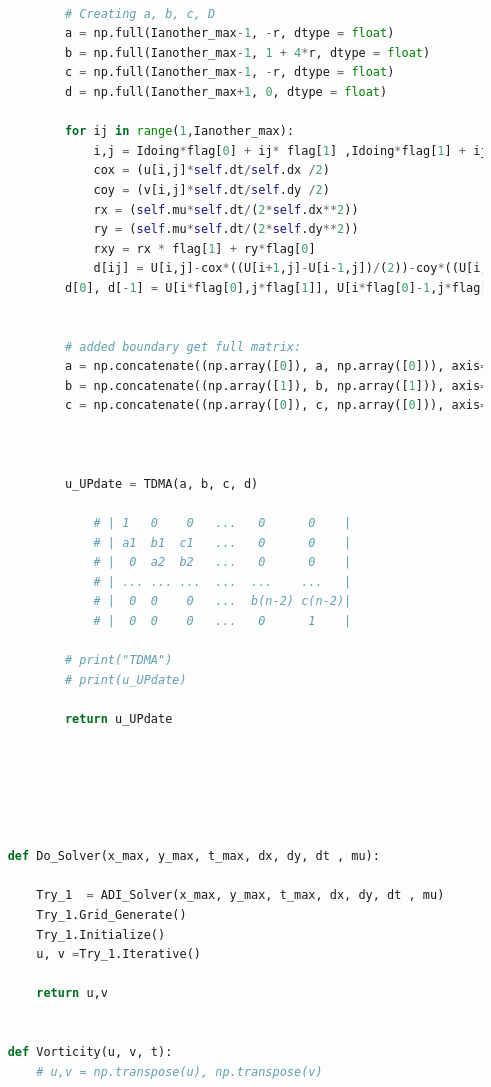 \documentclass[12pt]{article}
\begin{document}
\begin{scriptsize}
\begin{lstlisting}[language=python,caption={ADI Solver}]
    
            # Creating a, b, c, D
            a = np.full(Ianother_max-1, -r, dtype = float)
            b = np.full(Ianother_max-1, 1 + 4*r, dtype = float)
            c = np.full(Ianother_max-1, -r, dtype = float)
            d = np.full(Ianother_max+1, 0, dtype = float)
    
            for ij in range(1,Ianother_max):
                i,j = Idoing*flag[0] + ij* flag[1] ,Idoing*flag[1] + ij* flag[0]
                cox = (u[i,j]*self.dt/self.dx /2)
                coy = (v[i,j]*self.dt/self.dy /2)
                rx = (self.mu*self.dt/(2*self.dx**2))
                ry = (self.mu*self.dt/(2*self.dy**2))
                rxy = rx * flag[1] + ry*flag[0]
                d[ij] = U[i,j]-cox*((U[i+1,j]-U[i-1,j])/(2))-coy*((U[i,j+1]-U[i,j-1])/(2))+rxy*(U[i+flag[0],j+flag[1]]+U[i-flag[0],j-flag[1]])
            d[0], d[-1] = U[i*flag[0],j*flag[1]], U[i*flag[0]-1,j*flag[1]-1]
            
            
            # added boundary get full matrix:
            a = np.concatenate((np.array([0]), a, np.array([0])), axis=0)
            b = np.concatenate((np.array([1]), b, np.array([1])), axis=0)
            c = np.concatenate((np.array([0]), c, np.array([0])), axis=0)
    
    
               
            u_UPdate = TDMA(a, b, c, d)
    
                # | 1   0    0   ...   0      0    |
                # | a1  b1  c1   ...   0      0    |
                # |  0  a2  b2   ...   0      0    |
                # | ... ... ...  ...  ...    ...   |
                # |  0  0    0   ...  b(n-2) c(n-2)|
                # |  0  0    0   ...   0      1    |
            
            # print("TDMA")
            # print(u_UPdate)
    
            return u_UPdate
    
    
    
    
    
    
    def Do_Solver(x_max, y_max, t_max, dx, dy, dt , mu):
         
        Try_1  = ADI_Solver(x_max, y_max, t_max, dx, dy, dt , mu)
        Try_1.Grid_Generate()
        Try_1.Initialize()
        u, v =Try_1.Iterative()
    
        return u,v
    
    
    def Vorticity(u, v, t):
        # u,v = np.transpose(u), np.transpose(v)
    

\end{lstlisting}
\end{scriptsize}
\end{document}
